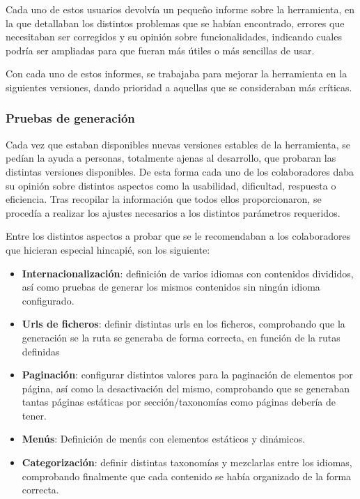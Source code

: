 \documentclass[a4paper,12pt]{article}
\begin{document}
Cada uno de estos usuarios devolvía un pequeño informe sobre la herramienta, en la que detallaban los distintos
problemas que se habían encontrado, errores que necesitaban ser corregidos y su opinión sobre
funcionalidades, indicando cuales podría ser ampliadas para que fueran más útiles o más sencillas de usar.

Con cada uno de estos informes, se trabajaba para mejorar la herramienta en la siguientes versiones, dando
prioridad a aquellas que se consideraban más críticas.

\subsubsection{Pruebas de generación}

Cada vez que estaban disponibles nuevas versiones estables de la herramienta, se pedían la ayuda a personas,
totalmente ajenas al desarrollo, que probaran las distintas versiones disponibles. De esta forma cada uno
de los colaboradores daba su opinión sobre  distintos aspectos como la usabilidad, dificultad, respuesta o eficiencia.
Tras recopilar la información que todos ellos proporcionaron, se procedía a realizar los ajustes
necesarios a los distintos parámetros requeridos.

Entre los distintos aspectos a probar que se le recomendaban a los
colaboradores que hicieran especial hincapié, son los siguiente:

\begin{itemize}
\item \textbf{Internacionalización}: definición de varios idiomas con contenidos divididos, así como pruebas de generar
los mismos contenidos sin ningún idioma configurado.
\item \textbf{Urls de ficheros}: definir distintas urls en los ficheros, comprobando que la generación se la ruta
se generaba de forma correcta, en función de la rutas definidas
\item \textbf{Paginación}: configurar distintos valores para la paginación de elementos por página, así como la desactivación
del mismo, comprobando que se generaban tantas páginas estáticas por sección/taxonomías como páginas debería de tener.
\item \textbf{Menús}: Definición de menús con elementos estáticos y dinámicos.
\item \textbf{Categorización}: definir distintas taxonomías y mezclarlas entre los idiomas, comprobando finalmente que cada
contenido se había organizado de la forma correcta.
\end{itemize}
\end{document}
